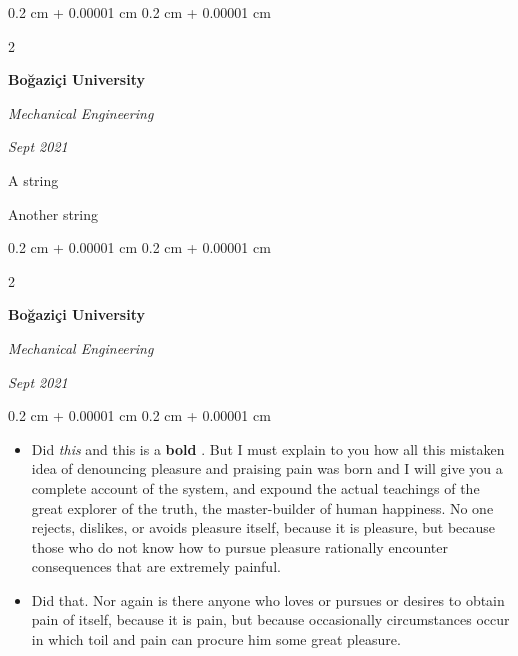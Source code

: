 \documentclass[10pt, letterpaper]{article}
\newenvironment{summary}{
    \begin{description}[
        topsep=0.10 cm,
        parsep=0.10 cm,
        partopsep=0pt,
        itemsep=0pt,
        leftmargin=0.4 cm + 10pt
    ]
}{
    \end{description}
} %
\newenvironment{highlights}{
    \begin{itemize}[
        topsep=0.10 cm,
        parsep=0.10 cm,
        partopsep=0pt,
        itemsep=0pt,
        leftmargin=0.4 cm + 10pt
    ]
}{
    \end{itemize}
} %
\newenvironment{onecolentry}{
    \begin{adjustwidth}{
        0.2 cm + 0.00001 cm
    }{
        0.2 cm + 0.00001 cm
    }
}{
    \end{adjustwidth}
} %
\newenvironment{twocolentry}[2][]{
    \onecolentry
    \def\secondColumn{#2}
    \setcolumnwidth{\fill, 4.5 cm}
    \begin{paracol}{2}
}{
    \switchcolumn \raggedleft \secondColumn
    \end{paracol}
    \endonecolentry
} %
\let\hrefWithoutArrow\href
\renewcommand{\href}[2]{\hrefWithoutArrow{#1}{\ifthenelse{\equal{#2}{}}{ }{#2 }\raisebox{.15ex}{\footnotesize \faExternalLink*}}}
\begin{document}
        \vspace{0.2 cm}

        \begin{twocolentry}{
            
            
        \textit{Sept 2021}}
            \textbf{Boğaziçi University}

            \textit{Mechanical Engineering}
        \end{twocolentry}
            \begin{summary}
                \item A string
                \item Another string
            \end{summary}


        \vspace{0.2 cm}

        \begin{twocolentry}{
            
            
        \textit{Sept 2021}}
            \textbf{Boğaziçi University}

            \textit{Mechanical Engineering}
        \end{twocolentry}
        \vspace{0.10 cm}
        \begin{onecolentry}
            \begin{highlights}
                \item Did \textit{this} and this is a \textbf{bold} \href{https://example.com}{link}. But I must explain to you how all this mistaken idea of denouncing pleasure and praising pain was born and I will give you a complete account of the system, and expound the actual teachings of the great explorer of the truth, the master-builder of human happiness. No one rejects, dislikes, or avoids pleasure itself, because it is pleasure, but because those who do not know how to pursue pleasure rationally encounter consequences that are extremely painful.
                \item Did that. Nor again is there anyone who loves or pursues or desires to obtain pain of itself, because it is pain, but because occasionally circumstances occur in which toil and pain can procure him some great pleasure.
            \end{highlights}
        \end{onecolentry}


        \vspace{0.2 cm}
\end{document}
